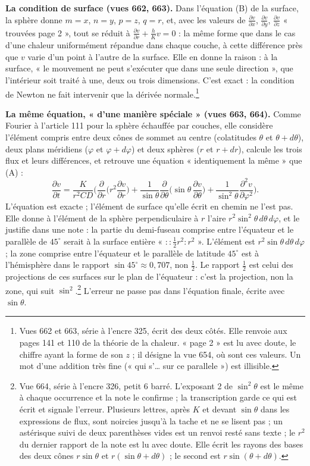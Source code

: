 \documentclass[11pt,a4paper]{article}
\begin{document}
\textbf{La condition de surface (vues 662, 663).} Dans l'équation (B) de la
surface, la sphère donne $m = x$, $n = y$, $p = z$, $q = r$, et, avec les
valeurs de $\frac{\partial v}{\partial x}$, $\frac{\partial v}{\partial y}$,
$\frac{\partial v}{\partial z}$ « trouvées page 2 », tout se réduit à
$\frac{\partial v}{\partial r} + \frac hK v = 0$ : la même forme que dans le cas
d'une chaleur uniformément répandue dans chaque couche, à cette différence
près que $v$ varie d'un point à l'autre de la surface. Elle en donne la raison
: à la surface, « le mouvement ne peut s'exécuter que dans une seule
direction », que l'intérieur soit traité à une, deux ou trois dimensions. C'est
exact : la condition de Newton ne fait intervenir que la dérivée
normale.\footnote{Vues 662 et 663, série à l'encre 325, écrit des deux côtés.
Elle renvoie aux pages 141 et 110 de la théorie de la chaleur. « page 2 » est lu
avec doute, le chiffre ayant la forme de son $z$ ; il désigne la vue 654, où
sont ces valeurs. Un mot d'une addition très fine (« qui s'… sur ce parallele »)
est illisible.}

\textbf{La même équation, « d'une manière spéciale » (vues 663, 664).} Comme
Fourier à l'article 111 pour la sphère échauffée par couches, elle considère
l'élément compris entre deux cônes de sommet au centre (colatitudes $\theta$ et
$\theta + d\theta$), deux plans méridiens ($\varphi$ et $\varphi + d\varphi$) et
deux sphères ($r$ et $r + dr$), calcule les trois flux et leurs différences, et
retrouve une équation « identiquement la même » que (A) :
\[
\frac{\partial v}{\partial t} = \frac{K}{r^2 CD}\Big(\frac{\partial}{\partial
r}\Big(r^2\frac{\partial v}{\partial r}\Big) + \frac{1}{\sin\theta}
\frac{\partial}{\partial\theta}\Big(\sin\theta\,\frac{\partial
v}{\partial\theta}\Big) + \frac{1}{\sin^2\theta}\frac{\partial^2
v}{\partial\varphi^2}\Big).
\]
L'équation est exacte ; l'élément de surface qu'elle écrit en chemin ne l'est
pas. Elle donne à l'élément de la sphère perpendiculaire à $r$ l'aire
$r^2\sin^2\theta\,d\theta\,d\varphi$, et le justifie dans une note : la partie
du demi-fuseau comprise entre l'équateur et le parallèle de $45^\circ$ serait à
la surface entière « $::\frac12 r^2 : r^2$ ». L'élément est
$r^2\sin\theta\,d\theta\,d\varphi$ ; la zone comprise entre l'équateur et le
parallèle de latitude $45^\circ$ est à l'hémisphère dans le rapport $\sin
45^\circ \approx 0{,}707$, non $\frac12$. Le rapport $\frac12$ est celui des
projections de ces surfaces sur le plan de l'équateur : c'est la projection,
non la zone, qui suit $\sin^2$.\footnote{Vue 664, série à l'encre 326, petit 6
barré. L'exposant 2 de $\sin^2\theta$ est le même à chaque occurrence et la
note le confirme ; la transcription garde ce qui est écrit et signale l'erreur.
Plusieurs lettres, après $K$ et devant $\sin\theta$ dans les expressions de
flux, sont noircies jusqu'à la tache et ne se lisent pas ; un astérisque suivi
de deux parenthèses vides est un renvoi resté sans texte ; le $r^2$ du dernier
rapport de la note est lu avec doute. Elle écrit les rayons des bases des deux
cônes $r\sin\theta$ et $r(\sin\theta + d\theta)$ ; le second est
$r\sin(\theta + d\theta)$.} L'erreur ne passe pas dans l'équation finale, écrite
avec $\sin\theta$.
\end{document}
